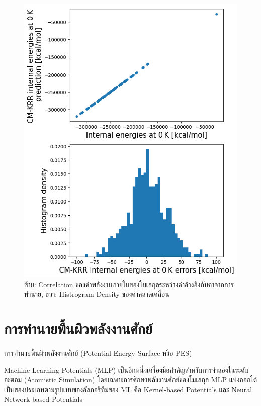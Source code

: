 \begin{figure}[htbp]
    \centering
    \includegraphics[width=0.8\linewidth]{fig/qm9_cm_kernel_corr.png}
    \caption{ซ้าย: Correlation ของค่าพลังงานภายในของโมเลกุลระหว่างค่าอ้างอิงกับค่าจากการทำนาย, ขวา: Histrogram Density 
    ของค่าคลาดเคลื่อน}
    \label{fig:qm9_cm_kernel_corr}
\end{figure}

\section{การทำนายพื้นผิวพลังงานศักย์}
\label{sec:pred_pot_ener}

การทำนายพื้นผิวพลังงานศักย์ (Potential Energy Surface หรือ PES)

Machine Learning Potentials (MLP) เป็นอีกหนึ่งเครื่องมือสำคัญสำหรับการจำลองในระดับอะตอม (Atomistic Simulation) 
โดยเฉพาะการศึกษาพลังงานศักย์ของโมเลกุล\autocite{behler2016,botu2017,brockherde2017,deringer2019,noe2020} 
MLP แบ่งออกได้เป็นสองประเภทตามรูปแบบของอัลกอริทึมของ ML คือ Kernel-based Potentials และ Neural Network-based Potentials

